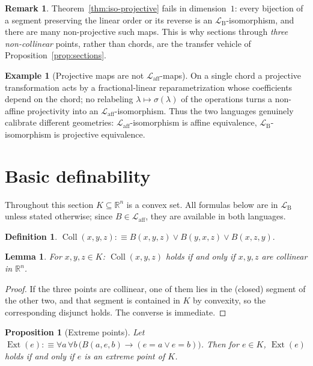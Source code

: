 \documentclass[11pt]{amsart}
\newtheorem{proposition}[theorem]{Proposition}
\newtheorem{lemma}[theorem]{Lemma}
\theoremstyle{definition}
\newtheorem{definition}[theorem]{Definition}
\newtheorem{remark}[theorem]{Remark}
\newtheorem{example}[theorem]{Example}
\newcommand{\R}{\mathbb{R}}
\newcommand{\Laff}{\mathcal{L}_{\mathrm{aff}}}
\newcommand{\LB}{\mathcal{L}_{\mathrm{B}}}
\newcommand{\Ext}{\operatorname{Ext}}
\newcommand{\Coll}{\operatorname{Coll}}
\begin{document}
\begin{remark}
Theorem~\ref{thm:iso-projective} fails in dimension~$1$: every bijection of a
segment preserving the linear order or its reverse is an $\LB$-isomorphism,
and there are many non-projective such maps. This is why sections through
\emph{three non-collinear} points, rather than chords, are the transfer
vehicle of Proposition~\ref{prop:sections}.
\end{remark}

\begin{example}[Projective maps are not $\Laff$-maps]\label{ex:proj-not-aff}
On a single chord a projective transformation acts by a fractional-linear
reparametrization whose coefficients depend on the chord; no relabeling
$\lambda\mapsto\sigma(\lambda)$ of the operations turns a non-affine
projectivity into an $\Laff$-isomorphism. Thus the two languages genuinely
calibrate different geometries: $\Laff$-isomorphism is affine equivalence,
$\LB$-isomorphism is projective equivalence.
\end{example}

\section{Basic definability}\label{sec:definability}

Throughout this section $K\subseteq\R^n$ is a convex set. All formulas below
are in $\LB$ unless stated otherwise; since $B\in\Laff$, they are available
in both languages.

\begin{definition}\label{def:coll}
$\Coll(x,y,z):\equiv B(x,y,z)\vee B(y,x,z)\vee B(x,z,y)$.
\end{definition}

\begin{lemma}\label{lem:coll}
For $x,y,z\in K$: $\Coll(x,y,z)$ holds if and only if $x,y,z$ are collinear
in $\R^n$.
\end{lemma}

\begin{proof}
If the three points are collinear, one of them lies in the (closed) segment
of the other two, and that segment is contained in $K$ by convexity, so the
corresponding disjunct holds. The converse is immediate.
\end{proof}

\begin{proposition}[Extreme points]\label{prop:extreme}
Let $\Ext(e):\equiv\forall a\,\forall b\,\bigl(B(a,e,b)\rightarrow
(e=a\vee e=b)\bigr)$. Then for $e\in K$, $\Ext(e)$ holds if and only if $e$
is an extreme point of $K$.
\end{proposition}
\end{document}
